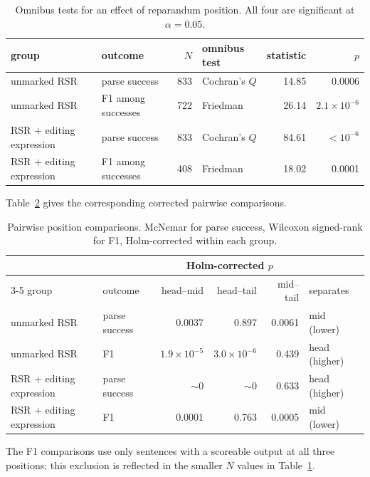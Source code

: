 \begin{table}[ht]
\centering
\small
\begin{tabular}{llrlrr}
\toprule
group & outcome & $N$ & omnibus test & statistic & $p$ \\
\midrule
unmarked RSR         & parse success       & 833 & Cochran's $Q$ & 14.85 & 0.0006 \\
unmarked RSR         & F1 among successes  & 722 & Friedman      & 26.14 & $2.1\times10^{-6}$ \\
RSR + editing expression & parse success       & 833 & Cochran's $Q$ & 84.61 & $<10^{-6}$ \\
RSR + editing expression & F1 among successes  & 408 & Friedman      & 18.02 & 0.0001 \\
\bottomrule
\end{tabular}
\caption{Omnibus tests for an effect of reparandum position. All four are
significant at $\alpha = 0.05$.}
\label{tab:position-omnibus}
\end{table}

Table~\ref{tab:position-pairwise} gives the corresponding corrected pairwise
comparisons.

\begin{table}[ht]
\centering
\small
\begin{tabular}{llrrrl}
\toprule
 & & \multicolumn{3}{c}{Holm-corrected $p$} & \\
\cmidrule(lr){3-5}
group & outcome & head--mid & head--tail & mid--tail & separates \\
\midrule
unmarked RSR         & parse success      & 0.0037 & 0.897 & 0.0061 & mid (lower) \\
unmarked RSR         & F1                 & $1.9\times10^{-5}$ & $3.0\times10^{-6}$ & 0.439 & head (higher) \\
RSR + editing expression & parse success      & ${\sim}0$ & ${\sim}0$ & 0.633 & head (higher) \\
RSR + editing expression & F1                 & 0.0001 & 0.763 & 0.0005 & mid (lower) \\
\bottomrule
\end{tabular}
\caption{Pairwise position comparisons. McNemar for parse success, Wilcoxon
signed-rank for F1, Holm-corrected within each group.}
\label{tab:position-pairwise}
\end{table}

The F1 comparisons use only sentences with a scoreable output at all three
positions; this exclusion is reflected in the smaller $N$ values in
Table~\ref{tab:position-omnibus}.

